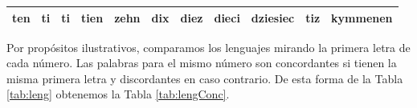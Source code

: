 \documentclass[a4paper, 20pt]{article}
\begin{document}
\begin{table}[h]
{\begin{tabular}{lllllllllll}
ten                                                  & ti                                                    & ti                                                   & tien                                                    & zehn                                                 & dix                                                    & diez                                                   & dieci                                                  & dziesiec                                             & tiz                                                   & kymmenen                                             \\ \bottomrule
\end{tabular}
}
\end{table}

Por propósitos ilustrativos, comparamos los lenguajes mirando la primera letra de cada número. Las palabras para el mismo número son concordantes si tienen la misma primera letra y discordantes en caso contrario. De esta forma de la Tabla \ref{tab:leng} obtenemos la Tabla \ref{tab:lengConc}.

\clearpage
\end{document}
